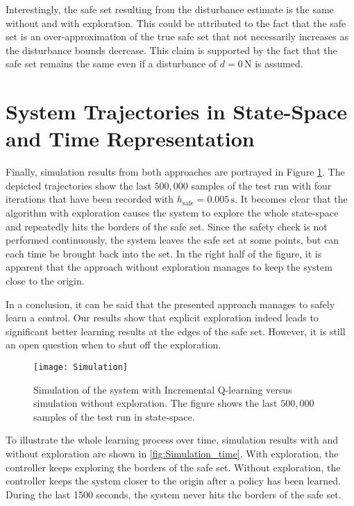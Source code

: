 \documentclass[../main.tex]{subfiles}
\begin{document}
Interestingly, the safe set resulting from the disturbance estimate is the same without and with exploration. This could be attributed to the fact that the safe set is an over-approximation of the true safe set that not necessarily increases as the disturbance bounds decrease. This claim is supported by the fact that the safe set remains the same even if a disturbance of $d = 0\,\text{N}$ is assumed.\par
\section{System Trajectories in State-Space and Time Representation}
Finally, simulation results from both approaches are portrayed in Figure \ref{fig:Simulation}. The depicted trajectories show the last $500,000$ samples of the test run with four iterations that have been recorded with $h_\text{safe} = 0.005\,\text{s}$. It becomes clear that the algorithm with exploration causes the system to explore the whole state-space and repeatedly hits the borders of the safe set. Since the safety check is not performed continuously, the system leaves the safe set at some points, but can each time be brought back into the set. In the right half of the figure, it is apparent that the approach without exploration manages to keep the system close to the origin. \par
In a conclusion, it can be said that the presented approach manages to safely learn a control. Our results show that explicit exploration indeed leads to significant better learning results at the edges of the safe set. However, it is still an open question when to shut off the exploration.

\begin{figure}
    \centering
    \texttt{[image: Simulation]}
        \caption{Simulation of the system with Incremental Q-learning versus simulation without exploration. The figure shows the last $500,000$ samples of the test run in state-space.}\label{fig:Simulation}
\end{figure}

To illustrate the whole learning process over time, simulation results with and without exploration are shown in \ref{fig:Simulation_time}. With exploration, the controller keeps exploring the borders of the safe set. Without exploration, the controller keeps the system closer to the origin after a policy has been learned. During the last 1500 seconds, the system never hits the borders of the safe set.
\end{document}
